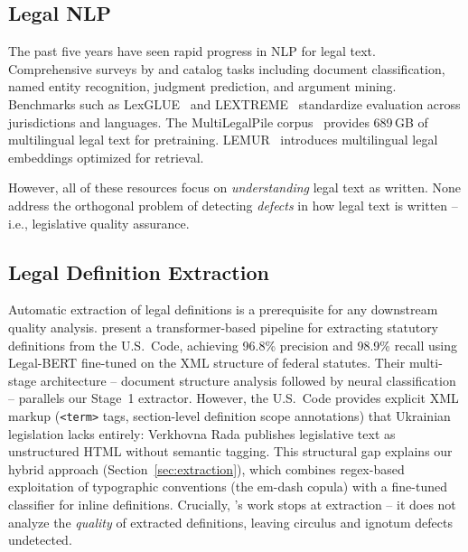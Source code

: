 \documentclass[11pt]{article}
\begin{document}
\subsection{Legal NLP}

The past five years have seen rapid progress in NLP for legal text.
Comprehensive surveys by \citet{katz2023natural} and \citet{ariai2024survey} catalog tasks including document classification, named entity recognition, judgment prediction, and argument mining.
Benchmarks such as LexGLUE~\citep{chalkidis2022lexglue} and LEXTREME~\citep{niklaus2023lextreme} standardize evaluation across jurisdictions and languages.
The MultiLegalPile corpus~\citep{niklaus2023multilegal} provides 689\,GB of multilingual legal text for pretraining.
LEMUR~\citep{ahmadi2026lemur} introduces multilingual legal embeddings optimized for retrieval.

However, all of these resources focus on \emph{understanding} legal text as written.
None address the orthogonal problem of detecting \emph{defects} in how legal text is written -- i.e., legislative quality assurance.

\subsection{Legal Definition Extraction}

Automatic extraction of legal definitions is a prerequisite for any downstream quality analysis.
\citet{hosabettu2025statutory} present a transformer-based pipeline for extracting statutory definitions from the U.S.\ Code, achieving 96.8\% precision and 98.9\% recall using Legal-BERT fine-tuned on the XML structure of federal statutes.
Their multi-stage architecture -- document structure analysis followed by neural classification -- parallels our Stage~1 extractor.
However, the U.S.\ Code provides explicit XML markup (\texttt{<term>} tags, section-level definition scope annotations) that Ukrainian legislation lacks entirely: Verkhovna Rada publishes legislative text as unstructured HTML without semantic tagging.
This structural gap explains our hybrid approach (Section~\ref{sec:extraction}), which combines regex-based exploitation of typographic conventions (the em-dash copula) with a fine-tuned classifier for inline definitions.
Crucially, \citeauthor{hosabettu2025statutory}'s work stops at extraction -- it does not analyze the \emph{quality} of extracted definitions, leaving circulus and ignotum defects undetected.
\end{document}
